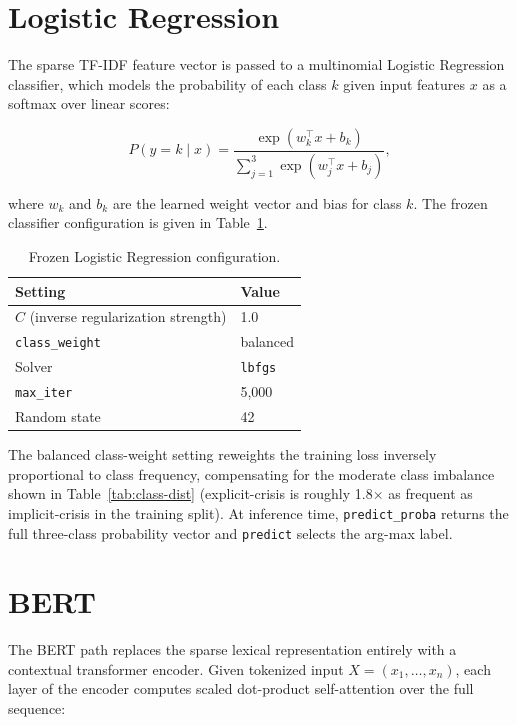 \section{Logistic Regression}

The sparse TF-IDF feature vector is passed to a multinomial Logistic Regression classifier, which models the probability of each class $k$ given input features $x$ as a softmax over linear scores:

\begin{equation}
P(y = k \mid x) = \frac{\exp(w_k^\top x + b_k)}{\sum_{j=1}^{3} \exp(w_j^\top x + b_j)},
\end{equation}

where $w_k$ and $b_k$ are the learned weight vector and bias for class $k$. The frozen classifier configuration is given in Table~\ref{tab:lr-config}.

\begin{table}[H]
\centering
\caption{Frozen Logistic Regression configuration.}
\label{tab:lr-config}
\begin{tabular}{ll}
\toprule
\textbf{Setting} & \textbf{Value} \\
\midrule
$C$ (inverse regularization strength) & 1.0 \\
\texttt{class\_weight} & balanced \\
Solver & \texttt{lbfgs} \\
\texttt{max\_iter} & 5{,}000 \\
Random state & 42 \\
\bottomrule
\end{tabular}
\end{table}

The balanced class-weight setting reweights the training loss inversely proportional to class frequency, compensating for the moderate class imbalance shown in Table~\ref{tab:class-dist} (explicit-crisis is roughly 1.8$\times$ as frequent as implicit-crisis in the training split). At inference time, \texttt{predict\_proba} returns the full three-class probability vector and \texttt{predict} selects the arg-max label.

\section{BERT}

The BERT path replaces the sparse lexical representation entirely with a contextual transformer encoder. Given tokenized input $X = (x_1, \dots, x_n)$, each layer of the encoder computes scaled dot-product self-attention over the full sequence:

